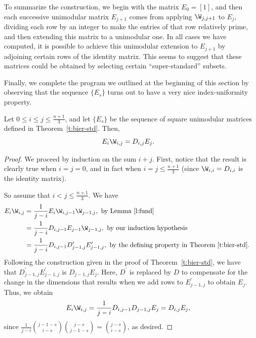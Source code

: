 \begin{remark}
To summarize the construction, we begin with the matrix $E_{0}=[1]$, and then each successive unimodular matrix $E_{j+1}$ comes from applying $\W_{j,j+1}$ to $E_{j}$, dividing each row by an integer to make the entries of that row relatively prime, and then extending this matrix to a unimodular one.  In all cases we have computed, it is possible to achieve this unimodular extension to $E_{j+1}$ by adjoining certain rows of the identity matrix.  This seems to suggest that these matrices could be obtained by selecting certain ``super-standard'' subsets.
\end{remark}

Finally, we complete the program we outlined at the beginning of this section by observing that the sequence $\{E_{s}\}$ turns out to have a very nice index-uniformity property.

\begin{theorem} \label{t:standard_bier}
Let $0 \leq i \leq j \leq \frac{n+1}{3}$, and let $\{E_{s}\}$ be the sequence of square unimodular matrices defined in Theorem~\ref{t:bier-std}.  Then,
\begin{equation*}
        E_{i}\W_{i,j} = D_{i,j}E_{j}.
\end{equation*}
\end{theorem}
\begin{proof}
We proceed by induction on the sum $i+j$.  First, notice that the result is clearly true when $i=j=0$, and in fact when $i=j \leq \frac{n+1}{3}$ (since $\W_{i,i} = D_{i,i}$ is the identity matrix).
    
So assume that $i < j \leq \frac{n+1}{3}$.  We have
\begin{align*}
        E_{i} \W_{i,j} &= \frac{1}{j-i} E_{i} \W_{i,j-1} \W_{j-1,j}, \mbox{ by Lemma \ref{l:fund}}\\
        &= \frac{1}{j-i} D_{i,j-1} E_{j-1} \W_{j-1,j}, \mbox{ by our induction hypothesis}\\
        &= \frac{1}{j-i} D_{i,j-1} D_{j-1,j}^{\prime} E_{j-1,j}^{\prime}, \mbox{ by the defining property in Theorem~\ref{t:bier-std}. }
\end{align*}
Following the construction given in the proof of Theorem~\ref{t:bier-std}, we have that $D_{j-1,j}^{\prime} E_{j-1,j}^{\prime}$ is $D_{j-1,j} E_{j}$.  Here, $D^{\prime}$ is replaced by $D$ to compensate for the change in the dimensions that results when we add rows to $E_{j-1,j}^{\prime}$ to obtain $E_j$.  Thus, we obtain
\[ E_i \W_{i,j} = \frac{1}{j-i} D_{i,j-1} D_{j-1,j} E_{j} = D_{i,j} E_{j}, \]
since $\frac{1}{j-i}\binom{j-1-s}{i - s} \binom{j - s}{j-1-s} = \binom{j-s}{i-s}$, as desired.
\end{proof}

